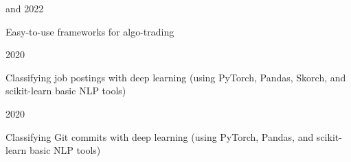 

\begin{cvprojects}

  \cvproject
    { and } %
    {} %
    {} %
    {2022} %
    {
      \begin{cvitems} %
        \item {Easy-to-use frameworks for algo-trading}
      \end{cvitems}
    }

  \cvproject
    {} %
    {} %
    {} %
    {2020} %
    {
      \begin{cvitems} %
        \item {Classifying job postings with deep learning (using PyTorch, Pandas, Skorch, and scikit-learn basic NLP tools)}
      \end{cvitems}
    }

  \cvproject
    {} %
    {} %
    {} %
    {2020} %
    {
      \begin{cvitems} %
        \item {Classifying Git commits with deep learning (using PyTorch, Pandas, and scikit-learn basic NLP tools)}
      \end{cvitems}
    }



\end{cvprojects}
